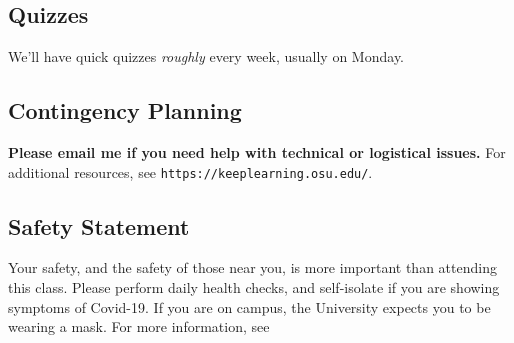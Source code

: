 \documentclass[12pt]{amsart}
\begin{document}
\subsection*{Quizzes}
We'll have quick quizzes \textit{roughly} every week, usually on
Monday. %



\subsection*{Contingency Planning} \textbf{Please email me if you need help
  with technical or logistical issues.}
For additional resources, see \texttt{https://keeplearning.osu.edu/}.

\subsection*{Safety Statement}

Your safety, and the safety of those near you, is more important than
attending this class. Please perform daily health checks, and
self-isolate if you are showing symptoms of Covid-19.  If you are on
campus, the University expects you to be wearing a mask. For more
information, see
\end{document}
